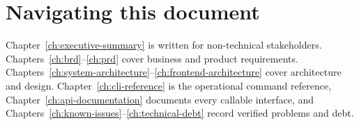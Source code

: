 \section{Navigating this document}

Chapter~\ref{ch:executive-summary} is written for non-technical stakeholders.
Chapters~\ref{ch:brd}--\ref{ch:prd} cover business and product requirements.
Chapters~\ref{ch:system-architecture}--\ref{ch:frontend-architecture} cover
architecture and design. Chapter~\ref{ch:cli-reference} is the operational
command reference, Chapter~\ref{ch:api-documentation} documents every callable
interface, and Chapters~\ref{ch:known-issues}--\ref{ch:technical-debt} record
verified problems and debt.
